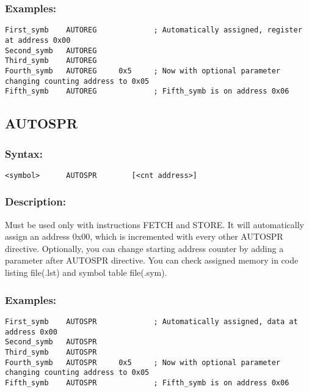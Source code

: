         \subsubsection{Examples:}
        {
            \usecodefont
            \verb'First_symb    AUTOREG             ; Automatically assigned, register at address 0x00'\\
            \verb'Second_symb   AUTOREG'\\
            \verb'Third_symb    AUTOREG'\\
            \verb'Fourth_symb   AUTOREG     0x5     ; Now with optional parameter changing counting address to 0x05'\\
            \verb'Fifth_symb    AUTOREG             ; Fifth_symb is on address 0x06'\\
        }

    \subsection{AUTOSPR}
        \subsubsection{Syntax:}
        {
            \usecodefont
            \verb'<symbol>      AUTOSPR        [<cnt address>]'
        }

    \subsubsection{Description:}
        Must be used only with instructions FETCH and STORE. It will automatically assign an address 0x00, which is incremented with every other AUTOSPR directive. Optionally, you can change starting address counter by adding a parameter after AUTOSPR directive. You can check assigned memory in code listing file(.lst) and symbol table file(.sym).

    \subsubsection{Examples:}
        {
            \usecodefont
            \verb'First_symb    AUTOSPR             ; Automatically assigned, data at address 0x00'\\
            \verb'Second_symb   AUTOSPR'\\
            \verb'Third_symb    AUTOSPR'\\
            \verb'Fourth_symb   AUTOSPR     0x5     ; Now with optional parameter changing counting address to 0x05'\\
            \verb'Fifth_symb    AUTOSPR             ; Fifth_symb is on address 0x06'\\
        }


